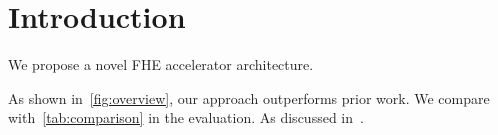 \section{Introduction}
\label{sec:intro}

We propose a novel FHE accelerator architecture.

As shown in~\cref{fig:overview}, our approach outperforms prior work.
We compare with~\cref{tab:comparison} in the evaluation.
As discussed in~\cite{craterlake2022}.
